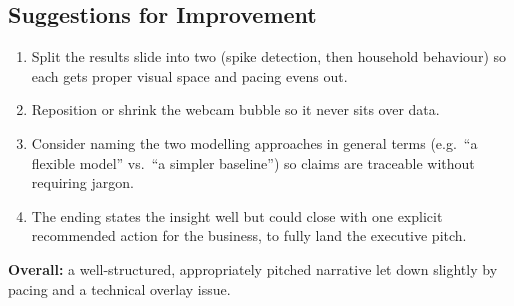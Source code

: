 \subsection*{Suggestions for Improvement}

\begin{enumerate}
\item Split the results slide into two (spike detection, then household behaviour) so each gets
proper visual space and pacing evens out.
\item Reposition or shrink the webcam bubble so it never sits over data.
\item Consider naming the two modelling approaches in general terms (e.g.\ ``a flexible model''
vs.\ ``a simpler baseline'') so claims are traceable without requiring jargon.
\item The ending states the insight well but could close with one explicit recommended action for
the business, to fully land the executive pitch.
\end{enumerate}

\noindent \textbf{Overall:} a well-structured, appropriately pitched narrative let down slightly
by pacing and a technical overlay issue.

